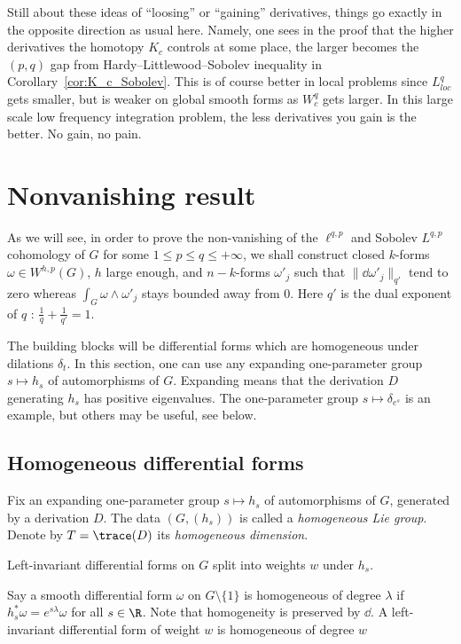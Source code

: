 
Still about these ideas of ``loosing'' or ``gaining'' derivatives, things go exactly in the opposite direction as usual here. Namely, one sees in the proof that the higher derivatives the homotopy $K_c$ controls at some place, the larger becomes the $(p,q)$ gap from Hardy--Littlewood--Sobolev inequality in Corollary~\ref{cor:K_c_Sobolev}. This is of course better in local problems since $L^q_{loc}$ gets smaller, but is weaker on global smooth forms as $W_c^q$ gets larger. In this large scale low frequency integration problem, the less derivatives you gain is the better. No gain, no pain.


\section{Nonvanishing result}\label{nonvanishing}

As we will see, in order to prove the non-vanishing of the $\ell^{q,p}$ and Sobolev $L^{q,p}$ cohomology of $G$ for some $1\leq p \leq q\leq +\infty$, we shall construct closed $k$-forms $\omega\in W^{h,p}(G)$, $h$ large enough, and $n-k$-forms $\omega'_j$ such that $\|\dd\omega'_j\|_{q'}$ tend to zero whereas $\int_{G}\omega\wedge\omega'_j$ stays bounded away from $0$. Here $q'$ is the dual exponent of $q$ : $\frac{1}{q}+\frac{1}{q'}=1$.


The building blocks will be differential forms which are homogeneous under dilations $\delta_t$. In this section, one can use any expanding one-parameter group $s\mapsto h_s$ of automorphisms of $G$. Expanding means that the derivation $D$ generating $h_s$ has positive eigenvalues. The one-parameter group $s\mapsto \delta_{e^s}$ is an example, but others may be useful, see below.

\subsection{Homogeneous differential forms}\label{sec:homog-diff-forms}

Fix an expanding one-parameter group $s\mapsto h_s$ of automorphisms of $G$, generated by a derivation $D$. The data $(G,(h_s))$ is called a \emph{homogeneous Lie group}. Denote by $T=\trace(D)$ its
\emph{homogeneous dimension}.

Left-invariant differential forms on $G$ split into weights $w$ under $h_s$.

Say a smooth differential form $\omega$ on $G\setminus\{1\}$ is homogeneous of degree $\lambda$ if $h_s^*\omega=e^{s\lambda} \omega$ for all $s\in\R$. Note that homogeneity is preserved by $\dd$. A left-invariant differential form of weight $w$ is homogeneous of degree $w$

